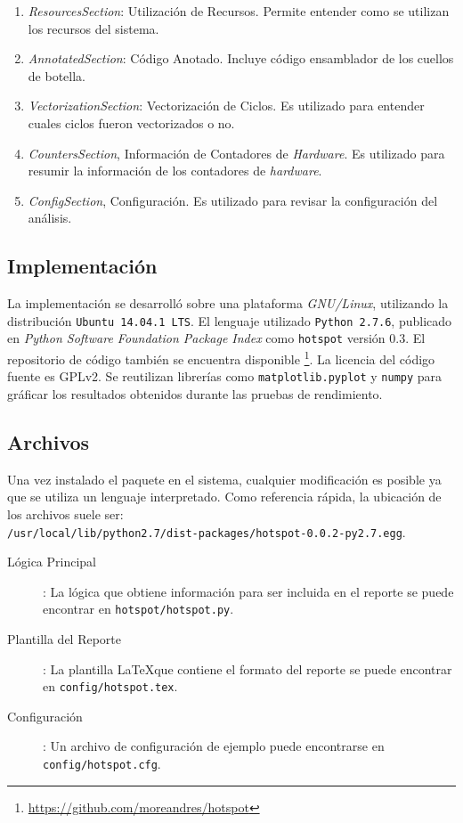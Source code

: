 \documentclass[a4paper]{report}
\begin{document}
\begin{enumerate}
\item {\it ResourcesSection}: Utilización de Recursos. Permite entender como se utilizan los recursos del sistema.
\item {\it AnnotatedSection}: Código Anotado. Incluye código ensamblador de los cuellos de botella. 
\item {\it VectorizationSection}: Vectorización de Ciclos. Es utilizado para entender cuales ciclos fueron vectorizados o no.
\item {\it CountersSection}, Información de Contadores de {\it Hardware}. Es utilizado para resumir la información de los contadores de {\it hardware}.
\item {\it ConfigSection}, Configuración. Es utilizado para revisar la configuración del análisis.
\end{enumerate}

\subsection{Implementación}

La implementación se desarrolló sobre una plataforma {\it GNU/Linux}, utilizando la distribución {\tt Ubuntu 14.04.1 LTS}.
El lenguaje utilizado {\tt Python 2.7.6}, publicado en {\it Python Software Foundation Package Index} como {\tt hotspot} versión 0.3.
El repositorio de código también se encuentra disponible \footnote{\href{https://github.com/moreandres/hotspot}{https://github.com/moreandres/hotspot}}.
La licencia del código fuente es GPLv2. Se reutilizan librerías como {\tt matplotlib.pyplot} \cite{matplotlib} y {\tt numpy} \cite{numpy} para gráficar los resultados obtenidos durante las pruebas de rendimiento.

\subsection{Archivos}

Una vez instalado el paquete en el sistema, cualquier modificación es posible ya que se utiliza un lenguaje interpretado. 
Como referencia rápida, la ubicación de los archivos suele ser: \\ {\tt /usr/local/lib/python2.7/dist-packages/hotspot-0.0.2-py2.7.egg}.

\begin{description}
\item[Lógica Principal]: La lógica que obtiene información para ser incluida en el reporte se puede encontrar en {\tt hotspot/hotspot.py}.
\item[Plantilla del Reporte]: La plantilla \LaTeX que contiene el formato del reporte se puede encontrar en {\tt config/hotspot.tex}.
\item[Configuración]: Un archivo de configuración de ejemplo puede encontrarse en {\tt config/hotspot.cfg}.
\end{description}
\end{document}
